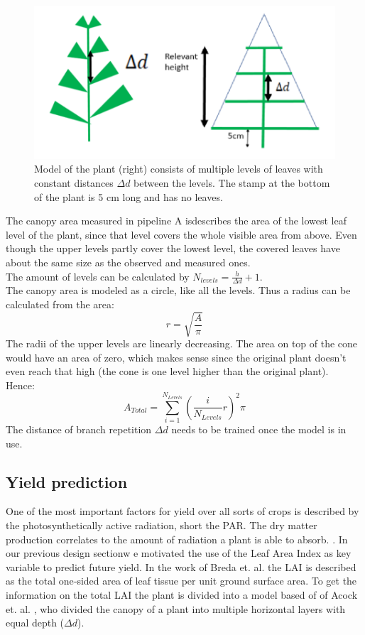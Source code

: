 \begin{figure}[H]
   \centering
   \includegraphics[scale=0.6]{branchRepetition.PNG}
   \caption{Model of the plant (right) consists of multiple levels of leaves with constant distances $\Delta d$ between the levels. The stamp at the bottom of the plant is 5 cm long and has no leaves.}
   \label{fig:branchRepetition}
\end{figure}

The canopy area measured in pipeline A isdescribes the area of the lowest leaf level of the plant, since that level covers the whole visible area from above. Even though the upper levels partly cover the lowest level, the covered leaves have about the same size as the observed and measured ones.\\
The amount of levels can be calculated by $N_{levels} = \frac{h}{\Delta d}+1$.\\ 
The canopy area is modeled as a circle, like all the levels. Thus a radius can be calculated from the area:
$$r = \sqrt{\frac{A}{\pi}}$$
The radii of the upper levels are linearly decreasing. The area on top of the cone would have an area of zero, which makes sense since the original plant doesn't even reach that high (the cone is one level higher than the original plant).\\ Hence:
$$A_{Total} = \sum_{i=1}^{N_{Levels}}(\frac{i}{N_{Levels}}r)^2\pi$$
The distance of branch repetition $\Delta d$ needs to be trained once the model is in use.

\subsection{Yield prediction}

\label{section:yieldPrediction}

One of the most important factors for yield over all sorts of crops is described by the photosynthetically active radiation,
short the PAR. The dry matter production correlates to the amount of radiation a plant is able to absorb. \cite{heuvelink1996tomato}.
In our previous design sectionw e motivated the use of the Leaf Area Index as key variable to predict future yield.
In the work of Breda et. al. the LAI is described as the total one‐sided area of leaf tissue per unit ground surface area.\cite{beda:nathalie}
To get the information on the total LAI the plant is divided into a model based of of Acock et. al. , who divided the canopy of a plant
into multiple horizontal layers with equal depth ($\Delta d$). \cite{acock1978contribution}

